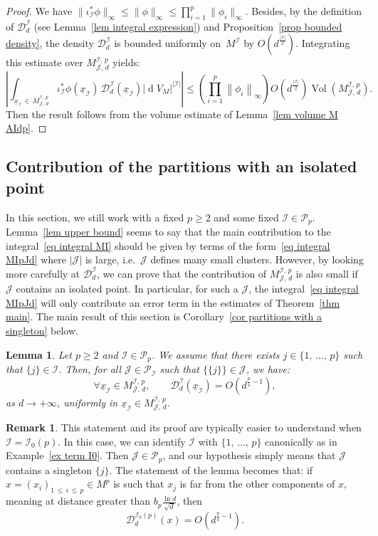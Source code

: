 \documentclass[10pt]{amsart}
\newtheorem{lemm}[theo]{Lemma}\newtheorem{prop}[theo]{Proposition}\newtheorem{coro}[theo]{Corollary}\newtheorem{conj}[theo]{Conjecture}
\theoremstyle{definition}\newtheorem{defi}[theo]{Definition}\newtheorem{rema}[theo]{Remark}\newtheorem{exam}[theo]{Example}\newtheorem{exem}[theo]{Example}\newtheorem{nota}[theo]{Notation}
\DeclareMathOperator{\dmesure}{d}
\DeclareMathOperator{\Vol}{Vol}
\newcommand{\D}{\mathcal{D}}
\newcommand{\I}{\mathcal{I}}
\newcommand{\J}{\mathcal{J}}
\newcommand{\pa}{\mathcal{P}\!}
\newcommand{\norm}[1]{\left\lvert #1 \right\rvert}
\newcommand{\Norm}[1]{\left\lVert #1 \right\rVert}
\newcommand{\rmes}[1]{\norm{\dmesure\! V_{#1}}}
\newcommand{\vol}[1]{\Vol\!\left(#1\right)}
\renewcommand{\geq}{\geqslant}
\renewcommand{\leq}{\leqslant}
\let\oldforall\forall
\renewcommand*{\forall}{\mathrel{\oldforall}}
\begin{document}
\begin{proof}
We have $\|\iota_\I^*\phi\|_\infty \leq \|\phi\|_\infty \leq \prod_{i=1}^p \|\phi_i\|_\infty$. Besides, by the definition of $\D_d^\I$ (see Lemma~\ref{lem integral expression}) and Proposition~\ref{prop bounded density}, the density $\D_d^\I$ is bounded uniformly on~$M^\I$ by $O(d^\frac{|\I|}{2})$. Integrating this estimate over $M^{\I,\,p}_{\J,\,d}$ yields:
\[
\norm{\int_{\underline{x}_\I\,\in\,M^{\I,\,p}_{\J,\,d}} \iota_\I^*\phi\left(\underline{x}_\I\right) \, \D^\I_d\left(\underline{x}_\I\right) \rmes{M}^{\norm{\I}}} \leq \left(\prod_{i=1}^p \Norm{\phi_i}_\infty\right) O\left(d^{\frac{\norm{\I}}{2}}\right) \vol{M^{\I,\,p}_{\J,\,d}}.
\]
Then the result follows from the volume estimate of Lemma~\ref{lem volume M AIdp}.
\end{proof}



\subsection{Contribution of the partitions with an isolated point}\label{subsec contribution of the partitions with an isolated point}

In this section, we still work with a fixed $p \geq 2$ and some fixed $\I \in \pa_p$. Lemma~\ref{lem upper bound} seems to say that the main contribution to the integral~\eqref{eq integral MI} should be given by terms of the form~\eqref{eq integral MIpJd} where $|\J|$ is large, i.e.~$\J$ defines many small clusters. However, by looking more carefully at $\D_d^\I$, we can prove that the contribution of $M^{\I,\,p}_{\J,\,d}$ is also small if $\J$ contains an isolated point. In particular, for such a $\J$, the integral~\eqref{eq integral MIpJd} will only contribute an error term in the estimates of Theorem~\ref{thm main}. The main result of this section is Corollary~\ref{cor partitions with a singleton} below.

\begin{lemm}\label{lem partitions with a singleton}
Let $p \geq 2$ and $\I \in \pa_p$. We assume that there exists $j \in \{1,\,\dots,\,p\}$ such that $\{j\} \in \I$. Then, for all $\J \in \pa_\I$ such that $\{\{j\}\} \in \J$, we have:
\[
\forall \underline{x}_\I \in M^{\I,\,p}_{\J,\,d}, \qquad \D^\I_d(\underline{x}_\I) = O\left(d^{\frac{p}{4}-1}\right),
\]
as $d \to +\infty$, uniformly in $\underline{x}_\I \in M^{\I,\,p}_{\J,\,d}$.
\end{lemm}

\begin{rema}\label{rem partitions with a singletons}
This statement and its proof are typically easier to understand when $\I =\I_0(p)$. In this case, we can identify $\I$ with $\{1,\,\dots,\,p\}$ canonically as in Example~\ref{ex term I0}. Then $\J \in \pa_p$, and our hypothesis simply means that $\J$ contains a singleton $\{j\}$. The statement of the lemma becomes that: if $x=(x_i)_{1\,\leq\,i\,\leq\,p} \in M^p$ is such that $x_j$ is far from the other components of $x$, meaning at distance greater than $b_p \tfrac{\ln d}{\sqrt{d}}$, then
\[
\D_d^{\I_0(p)}(x) = O\left(d^{\frac{p}{4}-1}\right).
\]
\end{rema}
\end{document}
